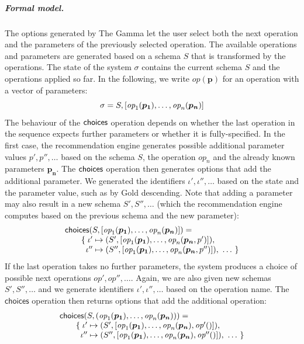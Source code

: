 \documentclass[a4paper,UKenglish,cleveref, autoref, thm-restate]{lipics-v2021}
\newcommand{\ident}[1]{\textsf{#1}}
\newcommand{\ddident}[1]{\guillemotleft\ident{#1}\guillemotright}
\newcommand{\choices}{\textnormal{\ident{choices}}}
\newcommand{\op}{\textit{op}}
\newcommand{\vect}[1]{\lbrack #1 \rbrack}
\begin{document}
\subparagraph{Formal model.}
The options generated by The Gamma let the user select both the next operation and the parameters
of the previously selected operation. The available operations and parameters are generated
based on a schema $S$ that is transformed by the operations. The state of the system $\sigma$
contains the current schema $S$ and the operations applied so far. In the following, we write
$\op(\boldsymbol{p})$ for an operation with a vector of parameters:
\[
\sigma = S, \vect{\op_1(\boldsymbol{p_1}), \ldots, \op_n(\boldsymbol{p_n})}\\
\]
The behaviour of the $\choices$ operation depends on whether the last operation in the sequence
expects further parameters or whether it is fully-specified. In the first case, the recommendation
engine generates possible additional parameter values $p', p'', \ldots$ based on the schema $S$,
the operation $\op_n$ and the already known parameters $\boldsymbol{p_n}$.
The $\choices$ operation then generates options that add the additional parameter. We generated the
identifiers $\iota',\iota'',\ldots$ based on the state and the parameter value, such as
\ddident{by Gold descending}. Note that adding a parameter may also result in a new schema
$S', S'', \ldots$ (which the recommendation engine computes based on the previous schema and the new parameter):
\[
\begin{array}{l}
\choices(S, \vect{\op_1(\boldsymbol{p_1}), \ldots, \op_n(\boldsymbol{p_n})}) =\\
\qquad \{\; \iota' \mapsto (S', \vect{\op_1(\boldsymbol{p_1}), \ldots, \op_n(\boldsymbol{p_n},p')}), \\
\qquad\;\;    \iota'' \mapsto (S'', \vect{\op_1(\boldsymbol{p_1}), \ldots, \op_n(\boldsymbol{p_n},p'')}), ~\ldots~\}
\end{array}
\]
If the last operation takes no further parameters, the system produces a choice
of possible next operations $\op', \op'', \ldots$. Again, we are also given new schemas $S', S'', \ldots$
and we generate identifiers $\iota',\iota'',\ldots$ based on the operation name. The $\ident{choices}$
operation then returns options that add the additional operation:
\[
\begin{array}{l}
\choices(S, (\op_1(\boldsymbol{p_1}), \ldots, \op_n(\boldsymbol{p_n}))) =\\
\qquad \{\; \iota' \mapsto (S', \vect{\op_1(\boldsymbol{p_1}), \ldots, \op_n(\boldsymbol{p_n}), \op'()}), \\
\qquad \;\; \iota'' \mapsto (S'', \vect{\op_1(\boldsymbol{p_1}), \ldots, \op_n(\boldsymbol{p_n}), \op''()}), ~\ldots~\}
\end{array}
\]
\end{document}
